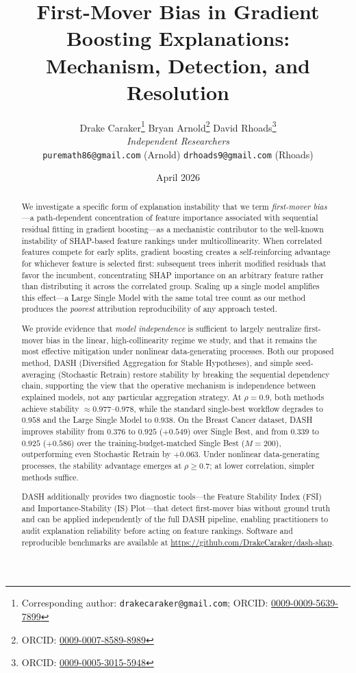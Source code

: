 \documentclass[11pt]{article}
\title{%
  \textbf{First-Mover Bias in Gradient Boosting Explanations:} \\[6pt]
  \large Mechanism, Detection, and Resolution
}
\author{
  Drake Caraker\thanks{Corresponding author: \texttt{drakecaraker@gmail.com}; ORCID: \href{https://orcid.org/0009-0009-5639-7899}{0009-0009-5639-7899}} \quad
  Bryan Arnold\thanks{ORCID: \href{https://orcid.org/0009-0007-8589-8989}{0009-0007-8589-8989}} \quad
  David Rhoads\thanks{ORCID: \href{https://orcid.org/0009-0005-3015-5948}{0009-0005-3015-5948}} \\[4pt]
  \textit{Independent Researchers} \\[2pt]
  \small\texttt{puremath86@gmail.com} (Arnold) \quad
  \small\texttt{drhoads9@gmail.com} (Rhoads)
}
\date{April 2026}
\newcommand{\dash}{\textsc{DASH}}
\newcommand{\rhovar}{\rho}
\begin{document}
\maketitle

\begin{abstract}
We investigate a specific form of explanation instability that we term
\emph{first-mover bias}---a path-dependent concentration of feature importance
associated with sequential residual fitting in gradient boosting---as a
mechanistic contributor to the well-known instability of SHAP-based feature
rankings under multicollinearity. When correlated features
compete for early splits, gradient boosting creates a self-reinforcing
advantage for whichever feature is selected first: subsequent trees inherit
modified residuals that favor the incumbent, concentrating SHAP importance on
an arbitrary feature rather than distributing it across the correlated group.
Scaling up a single model amplifies this effect---a Large Single Model with
the same total tree count as our method produces the \emph{poorest} attribution
reproducibility of any approach tested.

We provide evidence that \emph{model independence} is sufficient to largely
neutralize first-mover bias in the linear, high-collinearity regime we study,
and that it remains the most effective mitigation under nonlinear
data-generating processes. Both our proposed
method, \dash{} (Diversified Aggregation for Stable Hypotheses), and simple seed-averaging
(Stochastic Retrain) restore stability by breaking the sequential dependency
chain, supporting the view that the operative mechanism is independence between
explained models, not any particular aggregation strategy. At $\rhovar = 0.9$, both methods achieve stability
$\approx 0.977$--$0.978$, while the standard
single-best workflow degrades to $0.958$ and the Large Single Model to
$0.938$. On the Breast Cancer dataset, \dash{} improves stability from
$0.376$ to $0.925$ ($+0.549$) over Single Best, and from
$0.339$ to $0.925$ ($+0.586$) over the training-budget-matched
Single Best ($M{=}200$), outperforming even Stochastic Retrain by $+0.063$.
Under nonlinear data-generating processes, the stability advantage
emerges at $\rhovar \geq 0.7$; at lower correlation, simpler methods
suffice.

\dash{} additionally provides two diagnostic tools---the Feature
Stability Index (FSI) and Importance-Stability (IS) Plot---that detect
first-mover bias without ground truth and can be applied independently
of the full \dash{} pipeline, enabling practitioners to audit
explanation reliability before acting on feature rankings. Software and
reproducible benchmarks are available at
\url{https://github.com/DrakeCaraker/dash-shap}.
\end{abstract}
\end{document}
